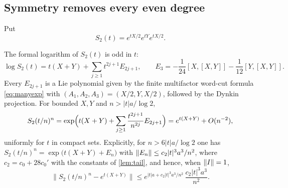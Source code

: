 \subsection{Symmetry removes every even degree}
Put
\begin{equation}\label{eq:S2}
 S_2(t)=e^{tX/2}e^{tY}e^{tX/2}.
\end{equation}
\begin{proposition}\label{prop:symmetric}
The formal logarithm of $S_2(t)$ is odd in $t$:
\begin{equation}\label{eq:S2log}
 \log S_2(t)=t(X+Y)+\sum_{j\geq1}t^{2j+1}E_{2j+1},\qquad
 E_3=-\frac1{24}[X,[X,Y]]-\frac1{12}[Y,[X,Y]].
\end{equation}
Every $E_{2j+1}$ is a Lie polynomial given by the finite multifactor
word-cut formula \eqref{eq:manyexp} with $(A_1,A_2,A_3)=(X/2,Y,X/2)$,
followed by the Dynkin projection. For bounded $X,Y$ and $n>|t|a/\log2$,
\begin{equation}\label{eq:S2all}
 S_2(t/n)^n=\exp\Bigl(t(X+Y)+\sum_{j\geq1}\frac{t^{2j+1}}{n^{2j}}E_{2j+1}\Bigr)
 =e^{t(X+Y)}+O(n^{-2}),
\end{equation}
uniformly for $t$ in compact sets. Explicitly, for $n>6|t|a/\log2$ one has
$S_2(t/n)^n=\exp\bigl(t(X+Y)+E_n\bigr)$ with
$\left\lVert E_n\right\rVert\leq c_2|t|^3a^3/n^2$, where $c_2=c_0+28c_0'$ with the constants
of \cref{lem:tail}, and hence, when $\left\lVert I\right\rVert=1$,
\begin{equation}\label{eq:S2error}
 \bigl\|S_2(t/n)^n-e^{t(X+Y)}\bigr\|
 \leq e^{|t|a+c_2|t|^3a^3/n^2}\,\frac{c_2|t|^3a^3}{n^2}.
\end{equation}
\end{proposition}
